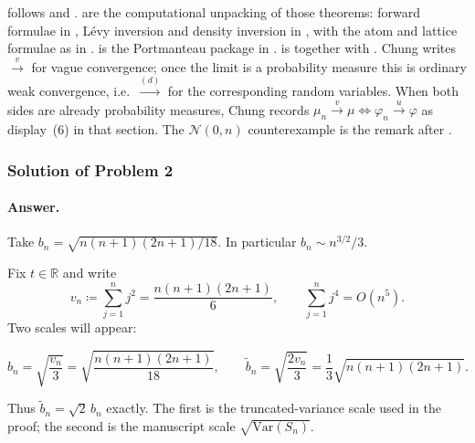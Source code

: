 \documentclass[11pt,a4paper]{article}
\begin{document}
\begin{remark}[References]
\label{rem:levy-refs}
 follows \citep[Theorems~3.3.1 and~3.3.2]{durrett2010} and \citep[Chapter~6]{chung1968}.  are the computational unpacking of those theorems: forward formulae in \citep[Theorems~3.3.1 and~3.3.2]{durrett2010}, L\'evy inversion and density inversion in \citep[Theorems~3.3.4 and~3.3.5]{durrett2010}, with the atom and lattice formulae as in \citep[Chapter~6]{chung1968}.  is the Portmanteau package in \citep[Theorems~3.2.3 and~3.2.5]{durrett2010}.  is \citep[Theorem~3.3.6, \S3.3.2, pp.~97--98]{durrett2010} together with \citep[Theorems~6.3.1 and~6.3.2, \S6.3]{chung1968}. Chung writes \(\xrightarrow{v}\) for vague convergence; once the limit is a probability measure this is ordinary weak convergence, i.e.\ \(\xrightarrow{(d)}\) for the corresponding random variables. When both sides are already probability measures, Chung records \(\mu_{n} \xrightarrow{v} \mu \iff \varphi_{n} \xrightarrow{u} \varphi\) as display~(6) in that section. The \(\mathcal{N}(0,n)\) counterexample is the remark after \citep[Theorem~3.3.6]{durrett2010}.
\end{remark}

\subsubsection{Solution of Problem 2}

\paragraph{Answer.}

Take \(b_{n}=\sqrt{n(n+1)(2n+1)/18}\). In particular \(b_{n}\sim n^{3/2}/3\).

Fix \(t\in\mathbb{R}\) and write
\[
v_{n}
\coloneqq
\sum_{j=1}^{n}j^{2}
=
\frac{n(n+1)(2n+1)}{6},
\qquad
\sum_{j=1}^{n}j^{4}
=
O(n^{5}).
\]
Two scales will appear:

\[
b_{n}
=
\sqrt{\frac{v_{n}}{3}}
=
\sqrt{\frac{n(n+1)(2n+1)}{18}},
\qquad
\tilde{b}_{n}
=
\sqrt{\frac{2v_{n}}{3}}
=
\frac13\sqrt{n(n+1)(2n+1)}.
\]

Thus \(\tilde{b}_{n}=\sqrt{2}\,b_{n}\) exactly. The first is the truncated-variance scale used in the proof; the second is the manuscript scale \(\sqrt{\mathrm{Var}(S_{n})}\).
\end{document}
